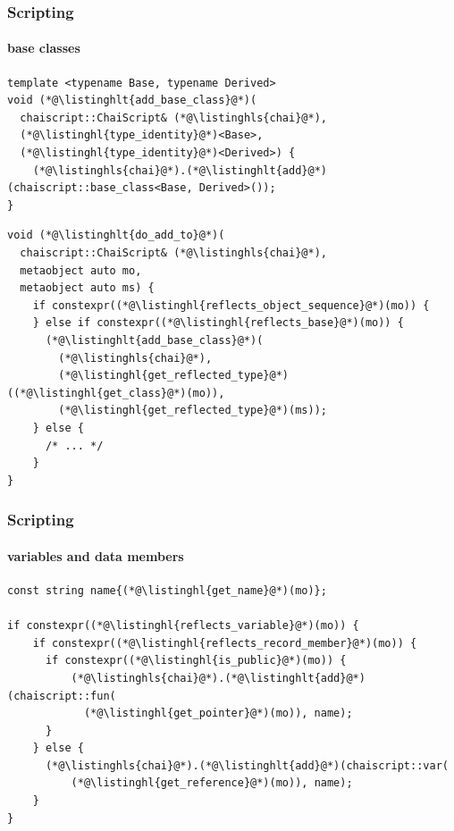 \documentclass[compress,table,xcolor=table]{beamer}
\begin{document}
\begin{frame}[fragile]
  \frametitle{Scripting}
  \framesubtitle{base classes}
  \begin{lstlisting}[language=c++2x,basicstyle=\scriptsize\ttfamily]
template <typename Base, typename Derived>
void (*@\listinghlt{add_base_class}@*)(
  chaiscript::ChaiScript& (*@\listinghls{chai}@*),
  (*@\listinghl{type_identity}@*)<Base>,
  (*@\listinghl{type_identity}@*)<Derived>) {
    (*@\listinghls{chai}@*).(*@\listinghlt{add}@*)(chaiscript::base_class<Base, Derived>());
}
  \end{lstlisting}
  \begin{lstlisting}[language=c++2x,basicstyle=\scriptsize\ttfamily]
void (*@\listinghlt{do_add_to}@*)(
  chaiscript::ChaiScript& (*@\listinghls{chai}@*),
  metaobject auto mo,
  metaobject auto ms) {
    if constexpr((*@\listinghl{reflects_object_sequence}@*)(mo)) {
    } else if constexpr((*@\listinghl{reflects_base}@*)(mo)) {
      (*@\listinghlt{add_base_class}@*)(
        (*@\listinghls{chai}@*),
        (*@\listinghl{get_reflected_type}@*)((*@\listinghl{get_class}@*)(mo)),
        (*@\listinghl{get_reflected_type}@*)(ms));
    } else {
      /* ... */
    }
}
  \end{lstlisting}
\end{frame}
\begin{frame}[fragile]
  \frametitle{Scripting}
  \framesubtitle{variables and data members}
  \begin{lstlisting}[language=c++2x,basicstyle=\small\ttfamily]
const string name{(*@\listinghl{get_name}@*)(mo)};

if constexpr((*@\listinghl{reflects_variable}@*)(mo)) {
    if constexpr((*@\listinghl{reflects_record_member}@*)(mo)) {
      if constexpr((*@\listinghl{is_public}@*)(mo)) {
          (*@\listinghls{chai}@*).(*@\listinghlt{add}@*)(chaiscript::fun(
            (*@\listinghl{get_pointer}@*)(mo)), name);
      }
    } else {
      (*@\listinghls{chai}@*).(*@\listinghlt{add}@*)(chaiscript::var(
          (*@\listinghl{get_reference}@*)(mo)), name);
    }
}
  \end{lstlisting}
\end{frame}
\end{document}
